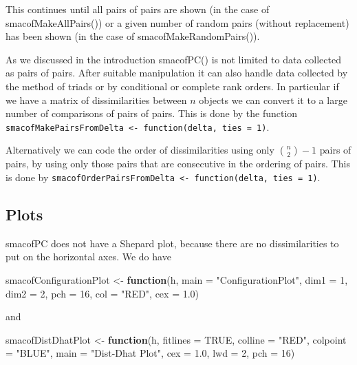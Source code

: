 \documentclass[
  12pt,
]{article}
\newenvironment{Shaded}{\begin{snugshade}}{\end{snugshade}}
\newcommand{\AttributeTok}[1]{\textcolor[rgb]{0.13,0.29,0.53}{#1}}
\newcommand{\ConstantTok}[1]{\textcolor[rgb]{0.56,0.35,0.01}{#1}}
\newcommand{\ControlFlowTok}[1]{\textcolor[rgb]{0.13,0.29,0.53}{\textbf{#1}}}
\newcommand{\DecValTok}[1]{\textcolor[rgb]{0.00,0.00,0.81}{#1}}
\newcommand{\FloatTok}[1]{\textcolor[rgb]{0.00,0.00,0.81}{#1}}
\newcommand{\NormalTok}[1]{#1}
\newcommand{\OtherTok}[1]{\textcolor[rgb]{0.56,0.35,0.01}{#1}}
\newcommand{\StringTok}[1]{\textcolor[rgb]{0.31,0.60,0.02}{#1}}
\begin{document}
This continues until all pairs of pairs are shown (in the case of
smacofMakeAllPairs()) or a given number of random pairs (without
replacement) has been shown (in the case of smacofMakeRandomPairs()).

As we discussed in the introduction smacofPC() is not limited to data
collected as pairs of pairs. After suitable manipulation it can also
handle data collected by the method of triads or by conditional or complete
rank orders. In particular if we have a matrix of
dissimilarities between \(n\) objects we can convert it to a large number of comparisons of pairs of pairs. This is done by the function
\texttt{smacofMakePairsFromDelta\ \textless{}-\ function(delta,\ ties\ =\ 1)}.

Alternatively we can code the order of dissimilarities using only
\(\binom{n}{2}-1\) pairs of pairs, by using only those pairs that are
consecutive in the ordering of pairs. This is done by
\texttt{smacofOrderPairsFromDelta\ \textless{}-\ function(delta,\ ties\ =\ 1)}.

\subsection{Plots}\label{plots}

smacofPC does not have a Shepard plot, because there are no
dissimilarities to put on the horizontal axes. We do have

\begin{Shaded}
\begin{Highlighting}[]
\NormalTok{smacofConfigurationPlot }\OtherTok{\textless{}{-}}
  \ControlFlowTok{function}\NormalTok{(h,}
           \AttributeTok{main =} \StringTok{"ConfigurationPlot"}\NormalTok{,}
           \AttributeTok{dim1 =} \DecValTok{1}\NormalTok{,}
           \AttributeTok{dim2 =} \DecValTok{2}\NormalTok{,}
           \AttributeTok{pch =} \DecValTok{16}\NormalTok{,}
           \AttributeTok{col =} \StringTok{"RED"}\NormalTok{,}
           \AttributeTok{cex =} \FloatTok{1.0}\NormalTok{)}
\end{Highlighting}
\end{Shaded}

and

\begin{Shaded}
\begin{Highlighting}[]
\NormalTok{smacofDistDhatPlot }\OtherTok{\textless{}{-}} \ControlFlowTok{function}\NormalTok{(h,}
                               \AttributeTok{fitlines =} \ConstantTok{TRUE}\NormalTok{,}
                               \AttributeTok{colline =} \StringTok{"RED"}\NormalTok{,}
                               \AttributeTok{colpoint =} \StringTok{"BLUE"}\NormalTok{,}
                               \AttributeTok{main =} \StringTok{"Dist{-}Dhat Plot"}\NormalTok{,}
                               \AttributeTok{cex =} \FloatTok{1.0}\NormalTok{,}
                               \AttributeTok{lwd =} \DecValTok{2}\NormalTok{,}
                               \AttributeTok{pch =} \DecValTok{16}\NormalTok{)}
\end{Highlighting}
\end{Shaded}
\end{document}
